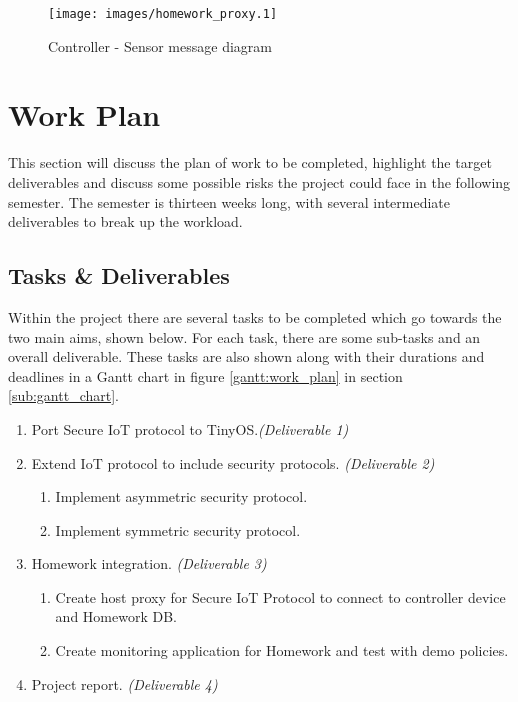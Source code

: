 \documentclass{mprop}
\begin{document}
\begin{figure}[h!]
\centering
\texttt{[image: images/homework\_proxy.1]}
\caption{Controller - Sensor message diagram}
\label{fig:sequence_diagram}
\end{figure}

\section{Work Plan}
This section will discuss the plan of work to be completed, highlight the target deliverables and discuss some possible risks the project could face in the following semester. The semester is thirteen weeks long, with several intermediate deliverables to break up the workload.


\subsection{Tasks \& Deliverables} %
\label{sub:deliverables}
Within the project there are several tasks to be completed which go towards the two main aims, shown below. For each task, there are some sub-tasks and an overall deliverable. These tasks are also shown along with their durations and deadlines in a Gantt chart in figure \ref{gantt:work_plan} in section \ref{sub:gantt_chart}. 

\begin{enumerate}
  \item Port Secure IoT protocol to TinyOS.\footnotesize{\textit{(Deliverable 1)}}
  \item Extend IoT protocol to include security protocols. \footnotesize{\textit{(Deliverable 2)}}
  \begin{enumerate}
    \item Implement asymmetric security protocol.
    \item Implement symmetric security protocol.
  \end{enumerate}
  \item Homework integration. \footnotesize{\textit{(Deliverable 3)}}
  \begin{enumerate}
    \item Create host proxy for Secure IoT Protocol to connect to controller device and Homework DB.
    \item Create monitoring application for Homework and test with demo policies.
  \end{enumerate}
  \item Project report. \footnotesize{\textit{(Deliverable 4)}}
\end{enumerate}
\end{document}
